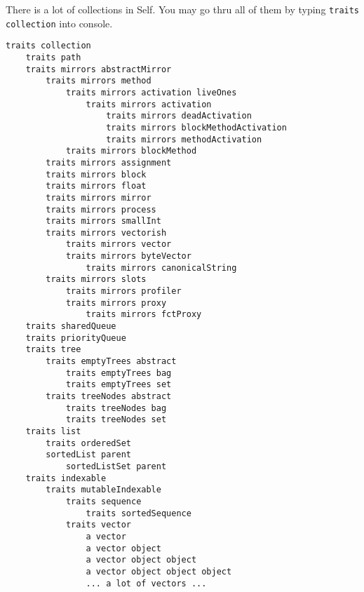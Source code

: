\documentclass[10pt]{article}
\begin{document}
\begin{multicols*}{3}
There is a lot of collections in Self. You may go thru all of them by typing \texttt{traits collection} into console.


\begin{lstlisting}
traits collection
    traits path
    traits mirrors abstractMirror
        traits mirrors method
            traits mirrors activation liveOnes
                traits mirrors activation
                    traits mirrors deadActivation
                    traits mirrors blockMethodActivation
                    traits mirrors methodActivation
            traits mirrors blockMethod
        traits mirrors assignment
        traits mirrors block
        traits mirrors float
        traits mirrors mirror
        traits mirrors process
        traits mirrors smallInt
        traits mirrors vectorish
            traits mirrors vector
            traits mirrors byteVector
                traits mirrors canonicalString
        traits mirrors slots
            traits mirrors profiler
            traits mirrors proxy
                traits mirrors fctProxy
    traits sharedQueue
    traits priorityQueue
    traits tree
        traits emptyTrees abstract
            traits emptyTrees bag
            traits emptyTrees set
        traits treeNodes abstract
            traits treeNodes bag
            traits treeNodes set
    traits list
        traits orderedSet
        sortedList parent
            sortedListSet parent
    traits indexable
        traits mutableIndexable
            traits sequence
                traits sortedSequence
            traits vector
                a vector
                a vector object
                a vector object object
                a vector object object object
                ... a lot of vectors ...


\end{lstlisting}
\end{multicols*}
\end{document}
